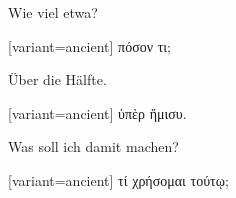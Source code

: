 Wie viel etwa?

\switchcolumn

\begin{greek}[variant=ancient]%
πόσον τι;

\end{greek}%
\switchcolumn*

Über die Hälfte.

\switchcolumn

\begin{greek}[variant=ancient]%
ὑπὲρ ἥμισυ.

\end{greek}%
\switchcolumn*

Was soll ich damit machen?

\switchcolumn

\begin{greek}[variant=ancient]%
τί χρήσομαι τούτῳ;

\end{greek}%

